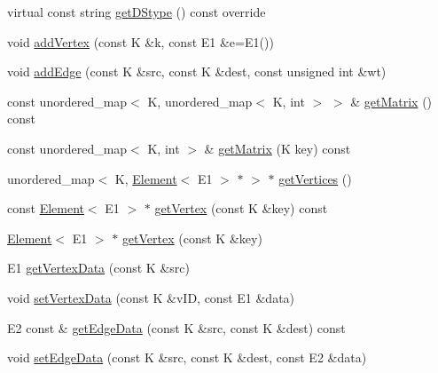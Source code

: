 \begin{DoxyCompactItemize}
\item 
virtual const string \hyperlink{classbridges_1_1datastructure_1_1_graph_adj_matrix_a2f8c67da1078354156fc646097152c6d}{get\+D\+Stype} () const override
\item 
void \hyperlink{classbridges_1_1datastructure_1_1_graph_adj_matrix_aaebb2607d06b1c36548652dba0211744}{add\+Vertex} (const K \&k, const E1 \&e=E1())
\item 
void \hyperlink{classbridges_1_1datastructure_1_1_graph_adj_matrix_ab23870ac203b3784157ecb05443494a4}{add\+Edge} (const K \&src, const K \&dest, const unsigned int \&wt)
\item 
const unordered\+\_\+map$<$ K, unordered\+\_\+map$<$ K, int $>$ $>$ \& \hyperlink{classbridges_1_1datastructure_1_1_graph_adj_matrix_aaf5c1ae5267b7ff4c8fcc861221ff2e8}{get\+Matrix} () const
\item 
const unordered\+\_\+map$<$ K, int $>$ \& \hyperlink{classbridges_1_1datastructure_1_1_graph_adj_matrix_a0b49749793278a1910dd5ea67dbaeacf}{get\+Matrix} (K key) const
\item 
unordered\+\_\+map$<$ K, \hyperlink{classbridges_1_1datastructure_1_1_element}{Element}$<$ E1 $>$ $\ast$ $>$ $\ast$ \hyperlink{classbridges_1_1datastructure_1_1_graph_adj_matrix_a4bcf803c43af2f14224a0891b9260fbf}{get\+Vertices} ()
\item 
const \hyperlink{classbridges_1_1datastructure_1_1_element}{Element}$<$ E1 $>$ $\ast$ \hyperlink{classbridges_1_1datastructure_1_1_graph_adj_matrix_a3de2ef8ce16e0c0d2240a92838ffd8aa}{get\+Vertex} (const K \&key) const
\item 
\hyperlink{classbridges_1_1datastructure_1_1_element}{Element}$<$ E1 $>$ $\ast$ \hyperlink{classbridges_1_1datastructure_1_1_graph_adj_matrix_a4100f224c05a77dd2c362c05fa15e6a2}{get\+Vertex} (const K \&key)
\item 
E1 \hyperlink{classbridges_1_1datastructure_1_1_graph_adj_matrix_a0be12527de2ab43b9de9b7ccd6e94d94}{get\+Vertex\+Data} (const K \&src)
\item 
void \hyperlink{classbridges_1_1datastructure_1_1_graph_adj_matrix_a8fb501cd1b1953c85e2aa3963f8ecd1f}{set\+Vertex\+Data} (const K \&v\+ID, const E1 \&data)
\item 
E2 const  \& \hyperlink{classbridges_1_1datastructure_1_1_graph_adj_matrix_ab6cd22b1a8f1e9f1c0865ba7aec6c6ca}{get\+Edge\+Data} (const K \&src, const K \&dest) const
\item 
void \hyperlink{classbridges_1_1datastructure_1_1_graph_adj_matrix_a9367d6bee5ce194bad2c8ca105d5be2f}{set\+Edge\+Data} (const K \&src, const K \&dest, const E2 \&data)

\end{DoxyCompactItemize}
